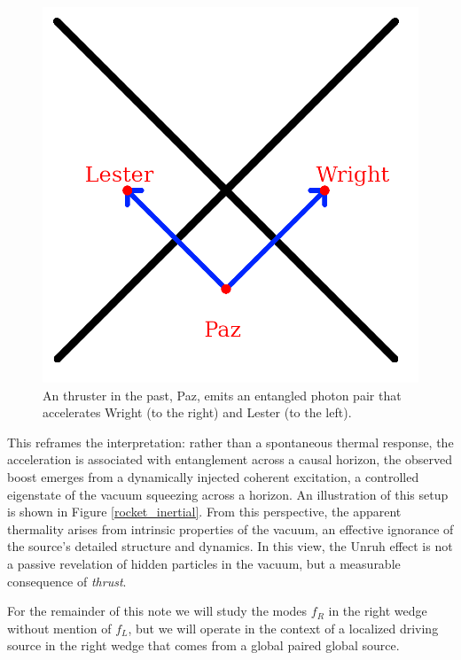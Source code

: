 \documentclass[12pt,a4paper]{article}
\begin{document}
\begin{figure}[h]
\centering
\includegraphics[scale=0.75]{paz.png}
\captionsetup{width=0.7\textwidth}
\caption{An thruster in the past, Paz, emits an entangled photon pair that accelerates Wright (to the right) and Lester (to the left).}
\label{paz}
\end{figure}

This reframes the interpretation: rather than a spontaneous thermal response, the acceleration is associated with entanglement across a causal horizon, the observed boost emerges from a dynamically injected coherent excitation, a controlled eigenstate of the vacuum squeezing across a horizon. An illustration of this setup is shown in Figure \ref{rocket_inertial}. From this perspective, the apparent thermality arises from intrinsic properties of the vacuum, an effective ignorance of the source's detailed structure and dynamics. In this view, the Unruh effect is not a passive revelation of hidden particles in the vacuum, but a measurable consequence of {\it thrust}.

For the remainder of this note we will study the modes $f_R$ in the right wedge without mention of $f_L$, but we will operate in the context of a localized driving source in the right wedge that comes from a global paired global source.
\end{document}
